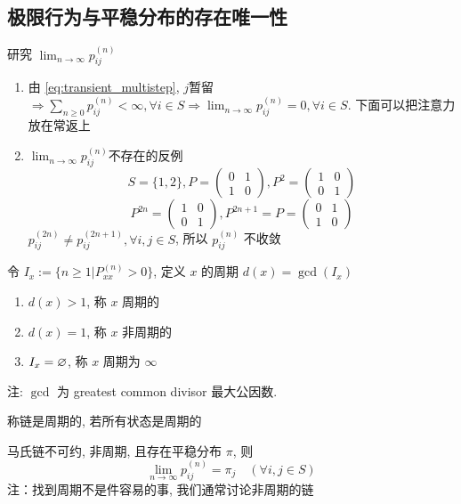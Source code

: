 \subsection{极限行为与平稳分布的存在唯一性}
研究 $\displaystyle \lim_{n\to \infty}p_{ij}^{(n)}$
\begin{enumerate}
    \item 由 \eqref{eq:transient_multistep}, $j$暂留 $\displaystyle\Rightarrow \sum_{n\geq 0}p_{ij}^{(n)}<\infty,\forall i\in S\Rightarrow \lim_{n\to \infty}p_{ij}^{(n)}=0,\forall i\in S$. 下面可以把注意力放在常返上
    \item $\displaystyle\lim_{n\to \infty}p_{ij}^{(n)}$不存在的反例
    \[
    S=\{1,2\}, P=\begin{pmatrix}
        0&1\\
        1&0
    \end{pmatrix}, P^2=\begin{pmatrix}
        1&0\\
        0&1
    \end{pmatrix}
    \]
    \[
    P^{2n}=\begin{pmatrix}
        1&0\\
        0&1
    \end{pmatrix}, P^{2n+1}=P=\begin{pmatrix}
        0&1\\
        1&0
    \end{pmatrix}
    \]
    $p_{ij}^{(2n)}\neq p_{ij}^{(2n+1)},\forall i,j\in S$, 所以 $p_{ij}^{(n)}$ 不收敛
\end{enumerate}

\begin{definition}[周期]\label{def:cycle}
    令 $I_x:=\{n\geq 1|P_{xx}^{(n)}>0\}$, 定义 $x$ 的周期 $d(x)=\gcd(I_x)$
    \begin{enumerate}
        \item $d(x)>1$, 称 $x$ 周期的
        \item $d(x)=1$, 称 $x$ 非周期的
        \item $I_x=\varnothing$, 称 $x$ 周期为 $\infty$
    \end{enumerate}
    注: $\gcd$ 为 greatest common divisor 最大公因数.
\end{definition}

\begin{definition}
    称链是周期的, 若所有状态是周期的
\end{definition}

\begin{theorem}[收敛定理]
    马氏链不可约, 非周期, 且存在平稳分布 $\pi$, 则
    \[
    \lim_{n\to\infty}p_{ij}^{(n)}=\pi_j\quad (\forall i,j\in S)
    \]
    注：找到周期不是件容易的事, 我们通常讨论非周期的链
\end{theorem}

